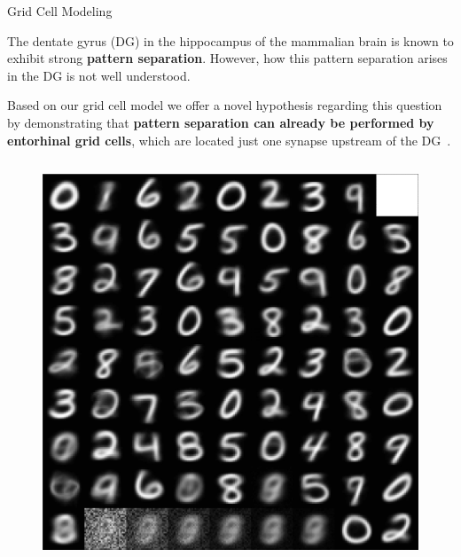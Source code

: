 \begin{frame}{Grid Cell Modeling }

\vspace{1.5em}
\justifying
The dentate gyrus (DG) in the hippocampus of the mammalian brain is known to 
exhibit strong {\bf pattern separation}. However, how this pattern separation 
arises in the DG is not well understood.

\vspace{1em}
Based on our grid cell model we offer a novel hypothesis regarding this 
question by demonstrating that {\bf pattern separation can already be performed 
by entorhinal grid cells}, which are located just one synapse upstream of the 
DG~\cite{kerdels2017}.

\begin{columns}[t]
\begin{column}{0.2\textwidth}
\begin{figure}
\includegraphics[width=\linewidth]{diss/80_p20.jpg}


\end{figure}
\end{column}
\end{columns}
\end{frame}
